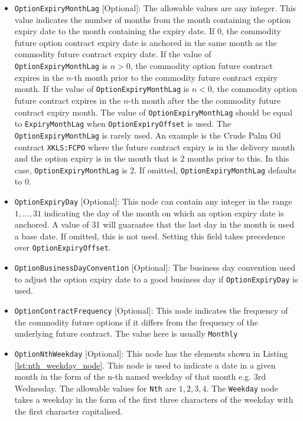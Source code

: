 \begin{itemize}
\item \lstinline!OptionExpiryMonthLag! [Optional]: The allowable values are any integer. This value indicates the number of months from the month containing the option expiry date to the month containing the expiry date. If 0, the commodity future option contract expiry date is anchored in the same month as the commodity future contract expiry date. If the value of \lstinline!OptionExpiryMonthLag! is $n > 0$, the commodity option future contract expires in the $n$-th month prior to the commodity future contract expiry month. If the value of \lstinline!OptionExpiryMonthLag! is $n < 0$, the commodity option future contract expires in the $n$-th month after the the commodity future contract expiry month. The value of \lstinline!OptionExpiryMonthLag! should be equal to \lstinline!ExpiryMonthLag! when \lstinline!OptionExpiryOffset! is used. The \lstinline!OptionExpiryMonthLag! is rarely used. An example is the Crude Palm Oil contract \lstinline!XKLS:FCPO! where the future contract expiry is in the delivery month and the option expiry is in the month that is 2 months prior to this. In this case, \lstinline!OptionExpiryMonthLag! is 2. If omitted, \lstinline!OptionExpiryMonthLag! defaults to 0.
\item \lstinline!OptionExpiryDay! [Optional]: This node can contain any integer in the range $1,\ldots,31$ indicating the day of the month on which an option expiry date is anchored. A value of 31 will guarantee that the last day in the month is used a base date. If omitted, this is not used. Setting this field takes precedence over \lstinline!OptionExpiryOffset!.\item \lstinline!OptionBusinessDayConvention! [Optional]: The business day convention used to adjust the option expiry date to a good business day if \lstinline!OptionExpiryDay! is used.
\item \lstinline!OptionContractFrequency! [Optional]: This node indicates the frequency of the commodity future options if it differs from the frequency of the underlying future contract. The value here is usually \lstinline!Monthly!
\item \lstinline!OptionNthWeekday! [Optional]: This node has the elements shown in Listing \ref{lst:nth_weekday_node}. This node is used to indicate a date in a given month in the form of the n-th named weekday of that month e.g. 3rd Wednesday. The allowable values for \lstinline!Nth! are ${1,2,3,4}$. The \lstinline!Weekday! node takes a weekday in the form of the first three characters of the weekday with the first character capitalised.

\end{itemize}
